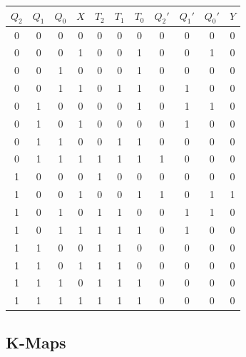 \documentclass{article}
\begin{document}
\begin{center}
\begin{tabular}{|c|c|c|c|c|c|c|c|c|c|c|}
\hline
$Q_2$ & $Q_1$ & $Q_0$ & $X$ & $T_2$ & $T_1$ & $T_0$ & $Q_2'$ & $Q_1'$ & $Q_0'$ & $Y$ \\
\hline
0 & 0 & 0 & 0 & 0 & 0 & 0 & 0 & 0 & 0 & 0 \\
0 & 0 & 0 & 1 & 0 & 0 & 1 & 0 & 0 & 1 & 0 \\
0 & 0 & 1 & 0 & 0 & 0 & 1 & 0 & 0 & 0 & 0 \\
0 & 0 & 1 & 1 & 0 & 1 & 1 & 0 & 1 & 0 & 0 \\
0 & 1 & 0 & 0 & 0 & 0 & 1 & 0 & 1 & 1 & 0 \\
0 & 1 & 0 & 1 & 0 & 0 & 0 & 0 & 1 & 0 & 0 \\
0 & 1 & 1 & 0 & 0 & 1 & 1 & 0 & 0 & 0 & 0 \\
0 & 1 & 1 & 1 & 1 & 1 & 1 & 1 & 0 & 0 & 0 \\
1 & 0 & 0 & 0 & 1 & 0 & 0 & 0 & 0 & 0 & 0 \\
1 & 0 & 0 & 1 & 0 & 0 & 1 & 1 & 0 & 1 & 1 \\
1 & 0 & 1 & 0 & 1 & 1 & 0 & 0 & 1 & 1 & 0 \\
1 & 0 & 1 & 1 & 1 & 1 & 1 & 0 & 1 & 0 & 0 \\
1 & 1 & 0 & 0 & 1 & 1 & 0 & 0 & 0 & 0 & 0 \\
1 & 1 & 0 & 1 & 1 & 1 & 0 & 0 & 0 & 0 & 0 \\
1 & 1 & 1 & 0 & 1 & 1 & 1 & 0 & 0 & 0 & 0 \\
1 & 1 & 1 & 1 & 1 & 1 & 1 & 0 & 0 & 0 & 0 \\
\hline
\end{tabular}
\end{center}

\subsection{K-Maps}
\end{document}
